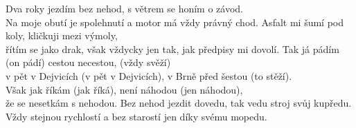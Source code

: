 \ve{}
Dva roky jezdím bez nehod,
s větrem se honím o závod.\\
Na moje obutí je spolehnutí
a motor má vždy právný chod.
\ve{}
Asfalt mi šumí pod koly,
kličkuji mezi výmoly,\\
řítím se jako drak, však vždycky jen tak,
jak předpisy mi dovolí.
\cho{}
Tak já pádím (on pádí)
cestou necestou, (vždy svěží)\\
v pět v Dejvicích (v pět v Dejvicích),
v Brně před šestou (to stěží).\\
Však jak říkám (jak říká),
není náhodou (jen náhodou),\\
že se nesetkám s nehodou.
\ve{}
Bez nehod jezdit dovedu,
tak vedu stroj svůj kupředu.\\
Vždy stejnou rychlostí a bez starostí
jen díky svému mopedu.
\esong{}